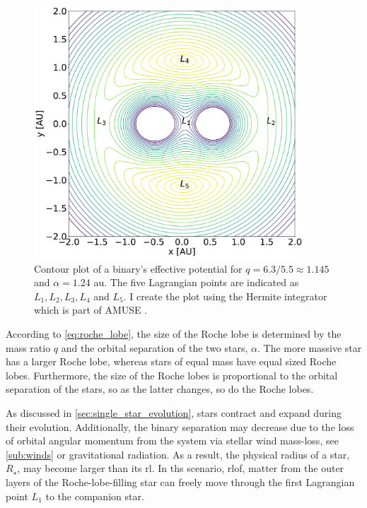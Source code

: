 \begin{figure}[H]
    \centering
    \includegraphics[width=0.9\textwidth]{Thesis/graphs/binary_equop.pdf}
    \caption{Contour plot of a binary's effective potential for $q=6.3/5.5 \approx 1.145$ and $\alpha = 1.24$ au. The five Lagrangian points are indicated as $L_1, L_2, L_3, L_4$ and $L_5$. I create the plot using the Hermite integrator which is part of AMUSE \citep{hut1995building}.}
    \label{fig:binary_equop}
\end{figure}
According to \cref{eq:roche_lobe}, the size of the Roche lobe is determined by the mass ratio $q$ and the orbital separation of the two stars, $\alpha$. The more massive star has a larger Roche lobe, whereas stars of equal mass have equal sized Roche lobes. Furthermore, the size of the Roche lobes is proportional to the orbital separation of the stars, so as the latter changes, so do the Roche lobes.

As discussed in \cref{sec:single_star_evolution}, stars contract and expand during their evolution. Additionally, the binary separation may decrease due to the loss of orbital angular momentum from the system via stellar wind mass-loss, see \cref{sub:winds} or gravitational radiation. As a result, the physical radius of a star, $R_{\star}$, may become larger than its \ac{rl}. In ths scenario, \ac{rlof,} matter from the outer layers of the Roche-lobe-filling star can freely move through the first Lagrangian point $L_1$ to the companion star. 

